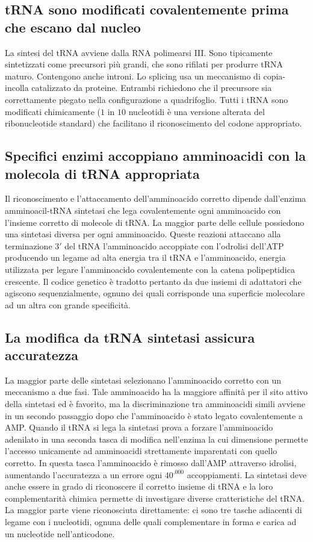 \subsection{tRNA sono modificati covalentemente prima che escano dal nucleo}
La sintesi del tRNA avviene dalla RNA polimearsi III. Sono tipicamente sintetizzati come precursori pi\`u grandi, che sono rifilati per produrre tRNA maturo. Contengono anche introni. Lo
splicing usa un meccanismo di copia-incolla catalizzato da proteine. Entrambi richiedono che il precursore sia correttamente piegato nella configurazione a quadrifoglio. Tutti i tRNA
sono modificati chimicamente ($1$ in $10$ nucleotidi \`e una versione alterata del ribonucleotide standard) che facilitano il riconoscimento del codone appropriato. 
\subsection{Specifici enzimi accoppiano amminoacidi con la molecola di tRNA appropriata}
Il riconoscimento e l'attaccamento dell'amminoacido corretto dipende dall'enzima amminoacil-tRNA sintetasi che lega covalentemente ogni amminoacido con l'insieme corretto di molecole di
tRNA. La maggior parte delle cellule possiedono una sintetasi diversa per ogni amminoacido. Queste reazioni attaccano alla terminazione $3'$ del tRNA l'amminoacido accoppiate con 
l'odrolisi dell'ATP producendo un legame ad alta energia tra il tRNA e l'amminoacido, energia utilizzata per legare l'amminoacido covalentemente con la catena polipeptidica crescente. 
Il codice genetico \`e tradotto pertanto da due insiemi di adattatori che agiscono sequenzialmente, ognuno dei quali corrisponde una superficie molecolare ad un altra con grande 
specificit\`a.
\subsection{La modifica da tRNA sintetasi assicura accuratezza}
La maggior parte delle sintetasi selezionano l'amminoacido corretto con un meccanismo a due fasi. Tale amminoacido ha la maggiore affinit\`a per il sito attivo della sintetasi ed \`e
favorito, ma la discriminazione tra amminoacidi simili avviene in un secondo passaggio dopo che l'amminoacido \`e stato legato covalentemente a AMP. Quando il tRNA si lega la sintetasi
prova a forzare l'amminoacido adenilato in una seconda tasca di modifica nell'enzima la cui dimensione permette l'accesso unicamente ad amminoacidi strettamente imparentati con quello
corretto. In questa tasca l'amminoacido \`e rimosso dall'AMP attraverso idrolisi, aumentando l'accuratezza a un errore ogni $40^.000$ accoppiamenti. La sintetasi deve anche essere in 
grado di riconoscere il corretto insieme di tRNA e la loro complementarit\`a chimica permette di investigare diverse cratteristiche del tRNA. La maggior parte viene riconosciuta 
direttamente: ci sono tre tasche adiacenti di legame con i nucleotidi, ognuna delle quali complementare in forma e carica ad un nucleotide nell'anticodone. 

